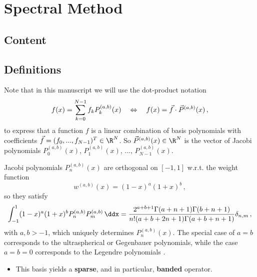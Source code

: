 \chapter{Spectral Method}
\label{chap:spectral-method}

\section{Content}



\section{Definitions}











Note that in this manuscript we will use the dot-product notation
$$f(x) = \sum_{k=0}^{N-1} f_k P_k^{(a, b)}(x) \quad\Leftrightarrow\quad f(x) = \vec{f} \cdot \vec{P}^{(a, b)}(x)\,,$$
to express that a function $f$ is a linear combination of basis polynomials with coefficients $\vec{f} = (f_0, ..., f_{N-1})^T \in \R^N$.
So $\vec{P}^{(a, b)}(x) \in \R^N$ is the vector of Jacobi polynomials $P^{(a, b)}_0(x)$, $P^{(a, b)}_1(x)$, ..., $P^{(a, b)}_{N-1}(x)$.

Jacobi polynomials $P_n^{(a,b)}(x)$ are orthogonal on $[-1,1]$ w.r.t. the weight function
\begin{equation*}
  w^{(a,b)}(x)=(1-x)^a (1+x)^b\,,
\end{equation*}
so they satisfy
\begin{align*}\label{eq:orthogonalityconditionJacobi}
  \int_{-1}^1(1-x)^a(1+x)^bP_n^{(a,b)}P_m^{(a,b)}\,\ddx = \frac{2^{a+b+1} \Gamma (a+n+1) \Gamma (b+n+1)}{n! (a+b+2 n+1) \Gamma (a+b+n+1)} \delta_{n,m}\,,
\end{align*}
with $a	,b>-1$, which uniquely determines $P_n^{(a,b)}(x)$. The special case of $a=b$ corresponds to the ultraspherical or Gegenbauer polynomials, while the case $a=b=0$ corresponds to the Legendre polynomials \cite{2018-nist}.

\begin{itemize}
  \item This basis yields a \textbf{sparse}, and in particular, \textbf{banded} operator.
\end{itemize}

